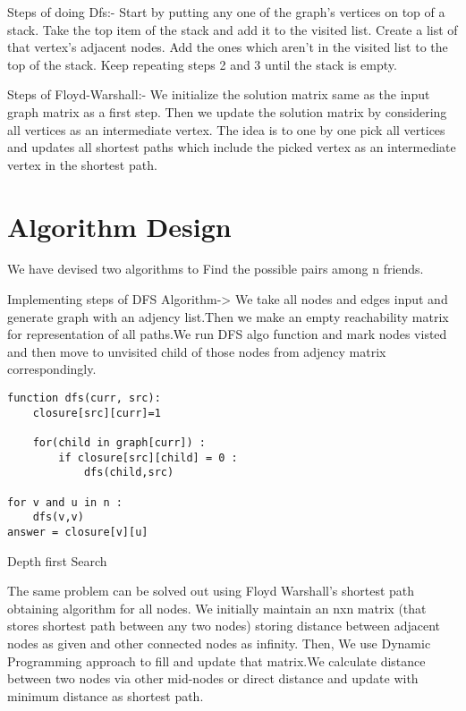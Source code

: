 \documentclass[conference]{IEEEtran}
\begin{document}
Steps of doing Dfs:-
Start by putting any one of the graph's vertices on top of a stack.
Take the top item of the stack and add it to the visited list.
Create a list of that vertex's adjacent nodes. Add the ones which aren't in the visited list to the top of the stack.
Keep repeating steps 2 and 3 until the stack is empty.

Steps of Floyd-Warshall:-
We initialize the solution matrix same as the input graph matrix as a first step. Then we update the solution matrix by considering all vertices as an intermediate vertex. The idea is to one by one pick all vertices and updates all shortest paths which include the picked vertex as an intermediate vertex in the shortest path.
\bigskip
\section{Algorithm Design}
We have devised two algorithms to Find the possible pairs among n friends.

Implementing steps of DFS Algorithm->
We take all nodes and edges input and generate graph with an adjency list.Then we make an empty reachability matrix for representation of all paths.We run DFS algo function and mark nodes visted and then move to unvisited child of those nodes from adjency matrix correspondingly.

\bigskip
\begin{algorithm}[H]
\begin{lstlisting}
function dfs(curr, src):
    closure[src][curr]=1

    for(child in graph[curr]) :
        if closure[src][child] = 0 :
            dfs(child,src)

for v and u in n :
    dfs(v,v)
answer = closure[v][u]
\end{lstlisting}
 \caption{Depth first Search }
\end{algorithm}

The same problem can be solved out using Floyd Warshall's shortest path obtaining algorithm for all nodes.
\newline We initially maintain an nxn matrix (that stores shortest path between any two nodes) storing distance between adjacent nodes as given and other connected nodes as infinity.
\newline Then, We use Dynamic Programming approach to fill and update that matrix.We calculate distance between two nodes via other mid-nodes or direct distance and update with minimum distance as shortest path.
\bigskip
\end{document}
